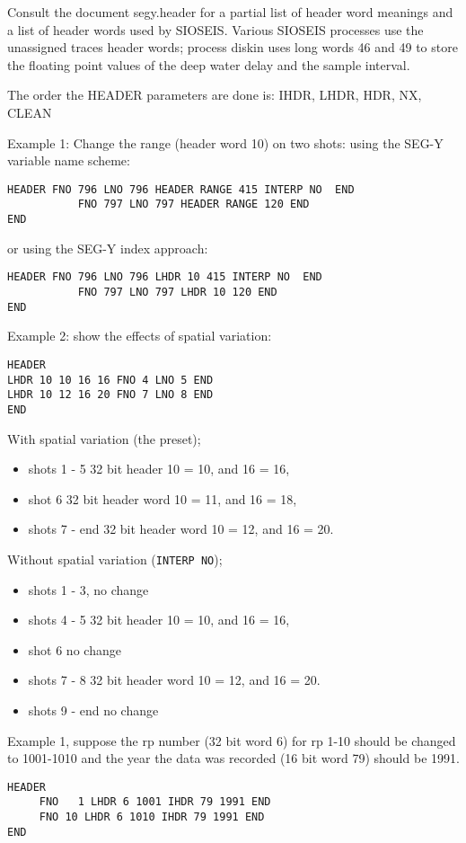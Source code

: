 Consult the document segy.header for a partial list of header word
meanings and a list of header words used by SIOSEIS.  Various SIOSEIS
processes use the unassigned traces header words; process diskin
uses long words 46 and 49 to store the floating point values of the
deep water delay and the sample interval.

The order the HEADER parameters are done is: IHDR, LHDR, HDR, NX, CLEAN

Example 1:     Change the range (header word 10) on two \glspl{shot}:
using the SEG-Y variable name scheme:
\begin{verbatim}
HEADER FNO 796 LNO 796 HEADER RANGE 415 INTERP NO  END
           FNO 797 LNO 797 HEADER RANGE 120 END
END
\end{verbatim}
or using the SEG-Y index approach:
\begin{verbatim}
HEADER FNO 796 LNO 796 LHDR 10 415 INTERP NO  END
           FNO 797 LNO 797 LHDR 10 120 END
END
\end{verbatim}

Example 2:  show the effects of spatial variation:
\begin{verbatim}
HEADER
LHDR 10 10 16 16 FNO 4 LNO 5 END
LHDR 10 12 16 20 FNO 7 LNO 8 END
END
\end{verbatim}

With spatial variation (the preset);

\begin{itemize}
\item shots 1 - 5 32 bit header 10 = 10, and 16 = 16,
\item shot 6 32 bit header word 10 = 11, and 16 = 18,
\item shots 7 - end 32 bit header word 10 = 12, and 16 = 20.
\end{itemize}

Without spatial variation (\texttt{INTERP NO});

\begin{itemize}
\item shots 1 - 3, no change
\item shots 4 - 5 32 bit header 10 = 10, and 16 = 16,
\item shot 6 no change
\item shots 7 - 8 32 bit header word 10 = 12, and 16 = 20.
\item shots 9 - end no change
\end{itemize}

Example 1, suppose the \gls{rp} number (32 bit word 6) for \gls{rp} 1-10 should be
changed to 1001-1010 and the year the data was recorded (16 bit word 79)
should be 1991.
\begin{verbatim}
HEADER
     FNO   1 LHDR 6 1001 IHDR 79 1991 END
     FNO 10 LHDR 6 1010 IHDR 79 1991 END
END
\end{verbatim}

